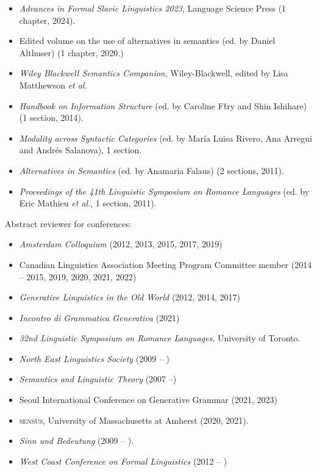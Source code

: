 \documentclass[11pt]{article}
\begin{document}
\begin{itemize}
  \item[] \textit{Advances in Formal Slavic Linguistics 2023}, Language Science Press (1 chapter, 2024).
  \item[] Edited volume on the use of alternatives in semantics (ed. by Daniel Althuser) (1 chapter, 2020.)
\item[] \textit{Wiley Blackwell Semantics Companion}, Wiley-Blackwell, edited by Lisa Matthewson \textit{et al.}
\item[] \textit{Handbook on Information Structure} (ed. by Caroline F\'try and Shin Ishihare) (1 section, 2014).
\item[] \textit{Modality across Syntactic Categories} (ed. by Mar\'ia Luisa Rivero, Ana Arregui and Andr\'es Salanova), 1 section.
\item[] \textit{Alternatives in Semantics} (ed. by Anamaria Falaus) (2
  sections, 2011).
\item[] \textit{Proceedings of the 41th Linguistic Symposium on
    Romance Languages} (ed. by Eric Mathieu \textit{et al.}, 1
  section, 2011).
\end{itemize}


Abstract reviewer for conferences:

\begin{itemize}
\item [] \textit{Amsterdam Colloquium} (2012, 2013, 2015, 2017, 2019)
\item[] Canadian Linguistics Association Meeting Program Committee member (2014 -- 2015, 2019, 2020, 2021, 2022)
\item[] \textit{Generative Linguistics in the Old World} (2012, 2014, 2017)
\item[] \textit{Incontro di Grammatica Generativa} (2021)
\item[] \textit{32nd Linguistic Symposium on Romance Languages}, University of Toronto.
\item[] \textit{North East Linguistics Society} (2009 -- )
\item[] \textit{Semantics and Linguistic Theory} (2007 --)
\item[] Seoul International Conference on Generative Grammar (2021, 2023)
\item[] \textsc{sensus}, University of Massachusetts at Amherst (2020, 2021).
\item[] \textit{Sinn und Bedeutung} (2009 -- ).
\item[] \textit{West Coast Conference on Formal Linguistics} (2012 -- )
\end{itemize}
\end{document}
